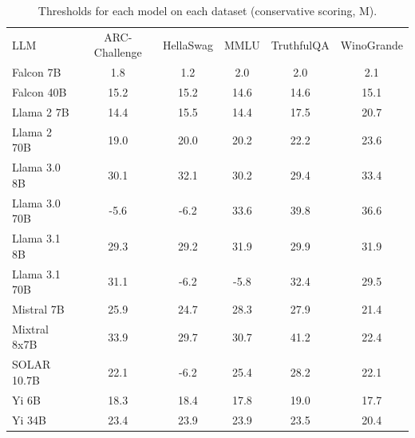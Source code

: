 \begin{table}[h]
\caption{Thresholds for each model on each dataset (conservative scoring, M). }
\label{tab:thresholds_logit_max_k20_w2}
\centering
\begin{tabular}{l S[table-format=3.1] S[table-format=3.1] S[table-format=3.1] S[table-format=3.1] S[table-format=3.1]}
\toprule
LLM & ARC-Challenge & HellaSwag & MMLU & TruthfulQA & WinoGrande \\ 
\cmidrule(lr){1-1} \cmidrule(lr){2-2} \cmidrule(lr){3-3} \cmidrule(lr){4-4} \cmidrule(lr){5-5} \cmidrule(lr){6-6}
Falcon 7B & 1.8 & 1.2 & 2.0 & 2.0 & 2.1\\
Falcon 40B & 15.2 & 15.2 & 14.6 & 14.6 & 15.1\\
Llama 2 7B & 14.4 & 15.5 & 14.4 & 17.5 & 20.7\\
Llama 2 70B & 19.0 & 20.0 & 20.2 & 22.2 & 23.6\\
Llama 3.0 8B & 30.1 & 32.1 & 30.2 & 29.4 & 33.4\\
Llama 3.0 70B & -5.6 & -6.2 & 33.6 & 39.8 & 36.6\\
Llama 3.1 8B & 29.3 & 29.2 & 31.9 & 29.9 & 31.9\\
Llama 3.1 70B & 31.1 & -6.2 & -5.8 & 32.4 & 29.5\\
Mistral 7B & 25.9 & 24.7 & 28.3 & 27.9 & 21.4\\
Mixtral 8x7B & 33.9 & 29.7 & 30.7 & 41.2 & 22.4\\
SOLAR 10.7B & 22.1 & -6.2 & 25.4 & 28.2 & 22.1\\
Yi 6B & 18.3 & 18.4 & 17.8 & 19.0 & 17.7\\
Yi 34B & 23.4 & 23.9 & 23.9 & 23.5 & 20.4\\
\bottomrule
\end{tabular}
\end{table}
